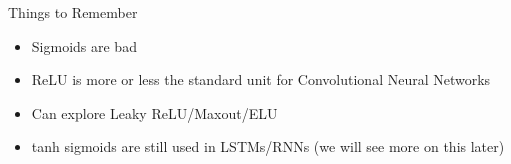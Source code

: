 
\begin{frame}
	\begin{block}{Things to Remember}
		\begin{itemize}[<+->]
			\justifying
			\item Sigmoids are bad 
			\item ReLU is more or less the standard unit for Convolutional Neural Networks
			\item Can explore Leaky ReLU/Maxout/ELU 
			\item tanh sigmoids are still used in LSTMs/RNNs (we will see more on this later)          
		\end{itemize}
		
	\end{block}
\end{frame}